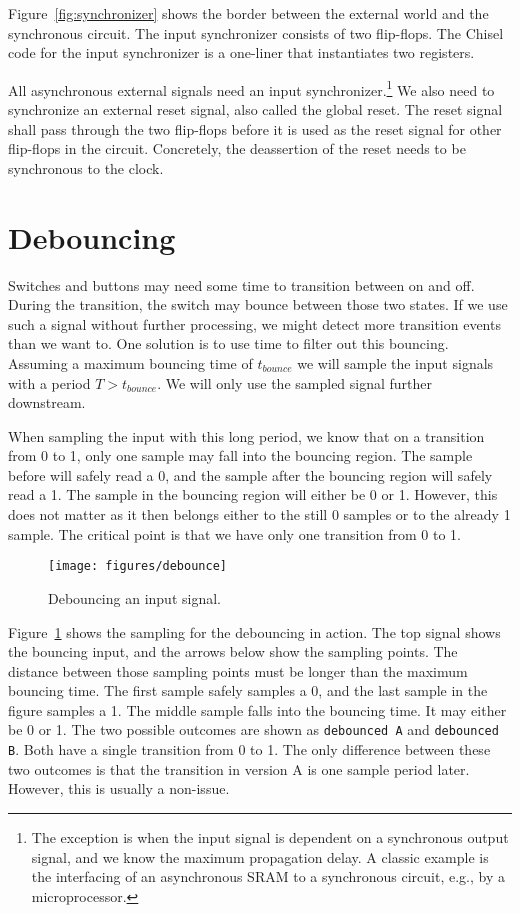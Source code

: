 \documentclass[%
    10pt,
    headinclude, footexclude,
    openright, %
    notitlepage,
    cleardoubleempty,
    headsepline,
    pointlessnumbers,
    bibtotoc, idxtotoc,
    ]{scrbook}
\newcommand{\scale}{0.7}
\newcommand{\code}[1]{{\lstinline[basicstyle=\small\ttfamily]{#1}}}
\begin{document}
Figure~\ref{fig:synchronizer} shows the border between the external world
and the synchronous circuit. The input synchronizer consists of
two flip-flops. The Chisel code for the input synchronizer is a one-liner that
instantiates two registers.


All asynchronous external signals need an input
synchronizer.\footnote{The exception is when the input signal is dependent
on a synchronous output signal, and we know the maximum propagation delay.
A classic example is the interfacing of an asynchronous SRAM
to a synchronous circuit, e.g., by a microprocessor.}
We also need to synchronize an external reset signal, also called the global reset. The reset signal
shall pass through the two flip-flops before it is used as the reset signal
for other flip-flops in the circuit. Concretely, the deassertion of the reset needs
to be synchronous to the clock.

\section{Debouncing}

Switches and buttons may need some time to transition between on and off.
During the transition, the switch may bounce between those two states.
If we use such a signal without further processing, we might detect more
transition events than we want to. One solution is to use time to filter out
this bouncing. Assuming a maximum bouncing time of $t_{bounce}$ we will sample the
input signals with a period $T > t_{bounce}$. We will only use the
sampled signal further downstream.

When sampling the input with this long period, we know that on a transition
from 0 to 1, only one sample may fall into the bouncing region.
The sample before will safely read a 0, and the sample after the bouncing
region will safely read a 1. The sample in the bouncing region will
either be  0 or 1. However, this does not matter as it then belongs either
to the still 0 samples or to the already 1 sample. The critical point
is that we have only one transition from 0 to 1.

\begin{figure}
  \centering
  \texttt{[image: figures/debounce]}
  \caption{Debouncing an input signal.}
  \label{fig:debounce}
\end{figure}

Figure~\ref{fig:debounce} shows the sampling for the debouncing in action.
The top signal shows the bouncing input, and the arrows below show the sampling
points. The distance between those sampling points must be longer
than the maximum bouncing time. The first sample safely samples a 0, and the last
sample in the figure samples a 1. The middle sample falls into the
bouncing time. It may either be 0 or 1. The two possible outcomes are
shown as \code{debounced A} and \code{debounced B}.
Both have a single transition from 0 to 1. The only difference between these
two outcomes is that the transition in version A is one sample period later.
However, this is usually a non-issue.
\end{document}
